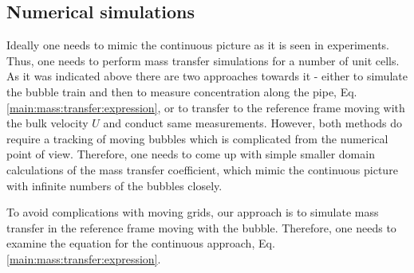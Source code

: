 \documentclass{article}
\begin{document}
\subsection{Numerical simulations}
\label{section:cases}
Ideally one needs to mimic the continuous picture as it is seen in experiments. Thus, one needs to
perform mass transfer simulations for a number of unit cells. As it was indicated above there are
two approaches towards it - either to simulate
the bubble train and then to measure concentration along the pipe, Eq.
\ref{main:mass:transfer:expression}, or to transfer to the reference frame moving with the bulk
velocity $U$ and conduct same measurements. However, both methods do require a tracking of
moving bubbles which is complicated from the numerical point of view. Therefore, one needs to come
up with simple smaller domain calculations of the mass transfer coefficient, which mimic the
continuous picture with infinite numbers of the bubbles closely. 

To avoid complications with moving grids, our
approach is to simulate mass transfer in the reference frame moving with the bubble. Therefore, one
needs to examine the equation for the continuous approach, Eq.
\ref{main:mass:transfer:expression}. 
\end{document}
